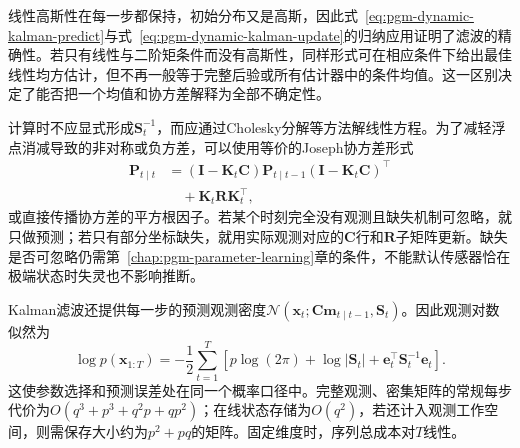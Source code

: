 线性高斯性在每一步都保持，初始分布又是高斯，因此式~\eqref{eq:pgm-dynamic-kalman-predict}与式~\eqref{eq:pgm-dynamic-kalman-update}的归纳应用证明了滤波的精确性。若只有线性与二阶矩条件而没有高斯性，同样形式可在相应条件下给出最佳线性均方估计，但不再一般等于完整后验或所有估计器中的条件均值。这一区别决定了能否把一个均值和协方差解释为全部不确定性。

计算时不应显式形成$\bm{S}_t^{-1}$，而应通过Cholesky分解等方法解线性方程。为了减轻浮点消减导致的非对称或负方差，可以使用等价的Joseph协方差形式
\begin{equation}
  \begin{aligned}
    \bm{P}_{t\mid t}
      &=(\bm{I}-\bm{K}_t\bm{C})
        \bm{P}_{t\mid t-1}
        (\bm{I}-\bm{K}_t\bm{C})^\top\\
      &\quad{}+\bm{K}_t\bm{R}\bm{K}_t^\top,
  \end{aligned}
  \label{eq:pgm-dynamic-joseph}
\end{equation}
或直接传播协方差的平方根因子。若某个时刻完全没有观测且缺失机制可忽略，就只做预测；若只有部分坐标缺失，就用实际观测对应的$\bm{C}$行和$\bm{R}$子矩阵更新。缺失是否可忽略仍需第~\ref{chap:pgm-parameter-learning}章的条件，不能默认传感器恰在极端状态时失灵也不影响推断。

Kalman滤波还提供每一步的预测观测密度$\mathcal N(\bm{x}_t;\bm{C}\bm{m}_{t\mid t-1},\bm{S}_t)$。因此观测对数似然为
\begin{equation}
  \log p(\bm{x}_{1:T})
    =-\frac12\sum_{t=1}^{T}
      \left[
        p\log(2\pi)+\log|\bm{S}_t|
        +\bm{e}_t^\top\bm{S}_t^{-1}\bm{e}_t
      \right].
  \label{eq:pgm-dynamic-kalman-likelihood}
\end{equation}
这使参数选择和预测误差处在同一个概率口径中。完整观测、密集矩阵的常规每步代价为$O(q^3+p^3+q^2p+qp^2)$；在线状态存储为$O(q^2)$，若还计入观测工作空间，则需保存大小约为$p^2+pq$的矩阵。固定维度时，序列总成本对$T$线性。

